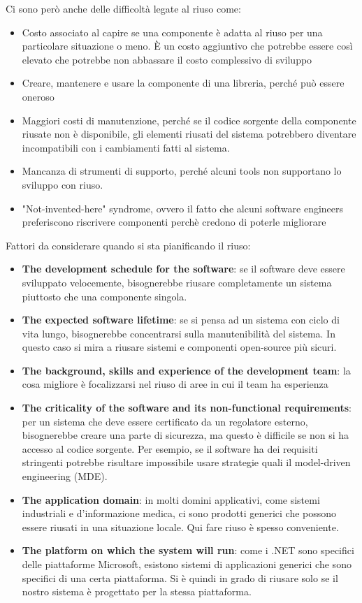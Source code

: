 			Ci sono però anche delle difficoltà legate al riuso come:
			\begin{itemize}
				\item Costo associato al capire se una componente è adatta al riuso per una particolare situazione o meno. È un costo aggiuntivo che potrebbe essere così elevato che potrebbe non abbassare il costo complessivo di sviluppo
				\item Creare, mantenere e usare la componente di una libreria, perché può essere oneroso
				\item Maggiori costi di manutenzione, perché se il codice sorgente della componente riusate non è disponibile, gli elementi riusati del sistema potrebbero diventare incompatibili con i cambiamenti fatti al sistema.
				\item Mancanza di strumenti di supporto, perché alcuni tools non supportano lo sviluppo con riuso.
				\item "Not-invented-here" syndrome, ovvero il fatto che alcuni software engineers preferiscono riscrivere componenti perchè credono di poterle migliorare
			\end{itemize}
			Fattori da considerare quando si sta pianificando il riuso:
			\begin{itemize}
				\item \textbf{The development schedule for the software}: se il software deve essere sviluppato velocemente, bisognerebbe riusare completamente un sistema piuttosto che una componente singola.
				\item \textbf{The expected software lifetime}: se si pensa ad un sistema con ciclo di vita lungo, bisognerebbe concentrarsi sulla manutenibilità del sistema. In questo caso si mira a riusare sistemi e componenti open-source più sicuri.
				\item \textbf{The background, skills and experience of the development team}: la cosa migliore è focalizzarsi nel riuso di aree in cui il team ha esperienza
				\item \textbf{The criticality of the software and its non-functional requirements}: per un sistema che deve essere certificato da un regolatore esterno, bisognerebbe creare una parte di sicurezza, ma questo è difficile se non si ha accesso al codice sorgente. Per esempio, se il software ha dei requisiti stringenti potrebbe risultare impossibile usare strategie quali il model-driven engineering (MDE).
				\item \textbf{The application domain}: in molti domini applicativi, come sistemi industriali e d'informazione medica, ci sono prodotti generici che possono essere riusati in una situazione locale. Qui fare riuso è spesso conveniente. 
				\item \textbf{The platform on which the system will run}: come i .NET sono specifici delle piattaforme Microsoft, esistono sistemi di applicazioni generici che sono specifici di una certa piattaforma. Si è quindi in grado di riusare solo se il nostro sistema è progettato per la stessa piattaforma.  
			\end{itemize}
		
